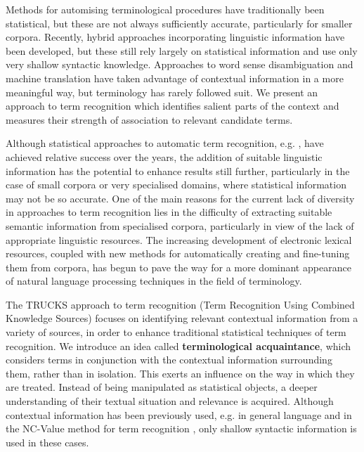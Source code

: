 Methods for automising terminological procedures have
traditionally been statistical, but these are not always sufficiently
accurate, particularly for smaller corpora. Recently, hybrid
approaches incorporating linguistic information have been developed,
but these still rely largely on statistical information and use only
very shallow syntactic knowledge. Approaches to word sense
disambiguation and machine translation have taken advantage
of contextual information in a more meaningful way, but terminology
has rarely followed suit. We present an approach to term recognition
which identifies salient parts of the context and measures their strength of association to relevant candidate terms. 

Although statistical approaches to automatic term recognition, e.g. \cite{Bourigault92,Daille94,Enguehard94,Justeson95,Lauriston96}, have
achieved relative success over the years, the addition of suitable linguistic
information has the potential to enhance results still further,
particularly in the case of small corpora or very specialised
domains, where statistical information may not be so accurate. 
One of the main reasons for the current lack of diversity in
approaches to term recognition lies in the difficulty of extracting
suitable semantic information from specialised corpora, particularly
in view of the lack of appropriate linguistic resources. The
increasing development of electronic lexical resources, coupled with
new methods for automatically creating and fine-tuning them from
corpora, has begun to pave the way for a more dominant appearance of
natural language processing techniques in the field of terminology. 

The TRUCKS approach to term recognition (Term Recognition Using
Combined Knowledge Sources) focuses on identifying
relevant contextual information from a variety of sources, in order to
enhance traditional statistical techniques of term
recognition. We introduce an idea called {\bf terminological
acquaintance}, which considers terms in conjunction with the
contextual information surrounding them, rather than in
isolation. This exerts an influence on the way in which they are
treated. Instead of being manipulated as statistical objects, a deeper
understanding of their textual situation and relevance is acquired. Although contextual information has been previously used,
e.g. in general language \cite{Grefenstette94} and in the NC-Value
method for term recognition \cite{Frantzi98,Frantzi99}, only shallow
syntactic information is used in these cases. 

